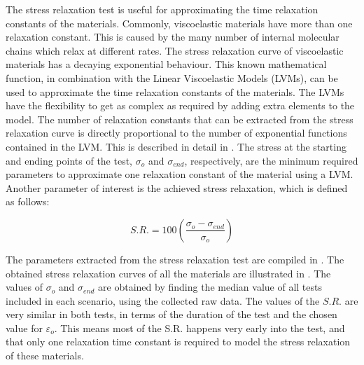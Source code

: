 The stress relaxation test is useful for approximating the time relaxation constants of the materials. Commonly, viscoelastic materials have more than one relaxation constant. This is caused by the many number of internal molecular chains which relax at different rates. The stress relaxation curve of viscoelastic materials has a decaying exponential behaviour. This known mathematical function, in combination with the Linear Viscoelastic Models (LVMs), can be used to approximate the time relaxation constants of the materials. The LVMs have the flexibility to get as complex as required by adding extra elements to the model. The number of relaxation constants that can be extracted from the stress relaxation curve is directly proportional to the number of exponential functions contained in the LVM. This is described in detail in . The stress at the starting and ending points of the test,  $\sigma_o$ and $\sigma_{end}$, respectively, are the minimum required parameters to approximate one relaxation constant of the material using a LVM. Another parameter of interest is the achieved stress relaxation, which is defined as follows:

\begin{equation}
	S.R. = 100\left( \frac{\sigma_o - \sigma_{end}}{\sigma_o}\right) 
\end{equation}

The parameters extracted from the stress relaxation test are compiled in . The obtained stress relaxation curves of all the materials are illustrated in . The values of $\sigma_o$ and $\sigma_{end}$ are obtained by finding the median value of all tests included in each scenario, using the collected raw data. The values of the $S.R.$ are very similar in both tests, in terms of the duration of the test and the chosen value for $\varepsilon_o$.  This means most of the S.R. happens very early into the test, and that only one relaxation time constant is required to model the stress relaxation of these materials.

